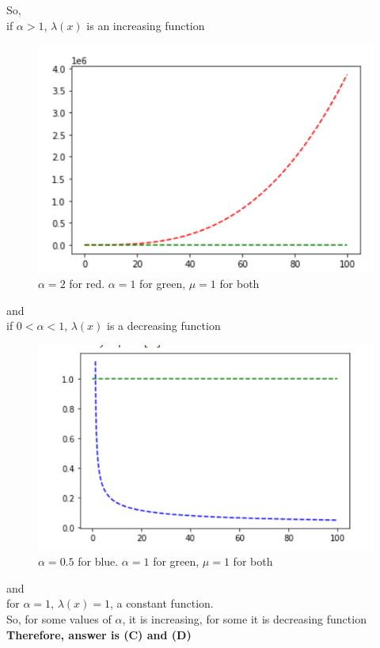 So,\\ if $\alpha>1$, $\lambda(x)$ is an increasing function
\begin{figure}[htp]
    \centering
    \includegraphics[width=\columnwidth]{variable/solutions/1/alphagrt1.png}
    \caption{$\alpha=2$ for red. $\alpha=1$ for green, $\mu=1$ for both}
    \label{var/1/fig:grt1}
\end{figure}
and\\ if $0<\alpha<1$, $\lambda(x)$ is a decreasing function
\begin{figure}[htp]
    \centering
    \includegraphics[width=\columnwidth]{variable/solutions/1/alphales1.png}
    \caption{$\alpha=0.5$ for blue. $\alpha=1$ for green, $\mu=1$ for both}
    \label{var/1/fig:les1}
\end{figure}
and\\ for $\alpha=1$, $\lambda(x)=1$, a constant function.\\
So, for some values of $\alpha$, it is increasing, for some it is decreasing function\\
\textbf{Therefore, answer is (C) and (D)}
